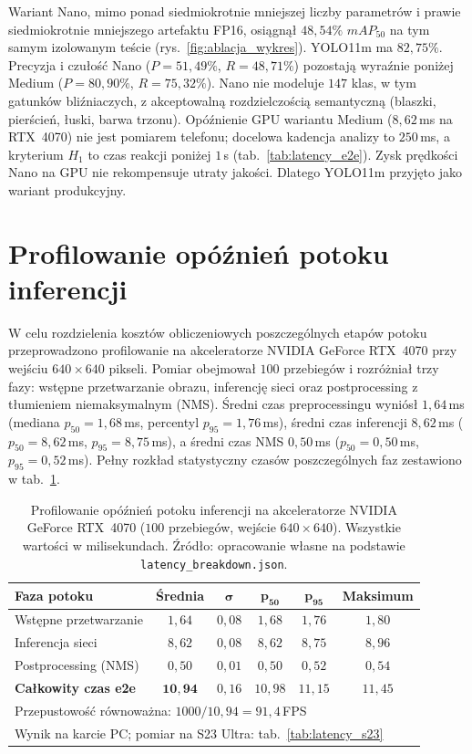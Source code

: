 Wariant Nano, mimo ponad siedmiokrotnie mniejszej liczby parametrów i prawie siedmiokrotnie mniejszego artefaktu FP16, osiągnął $48{,}54\%$ $mAP_{50}$ na tym samym izolowanym teście (rys.~\ref{fig:ablacja_wykres}). YOLO11m ma $82{,}75\%$. Precyzja i czułość Nano ($P=51{,}49\%$, $R=48{,}71\%$) pozostają wyraźnie poniżej Medium ($P=80{,}90\%$, $R=75{,}32\%$). Nano nie modeluje $147$ klas, w tym gatunków bliźniaczych, z akceptowalną rozdzielczością semantyczną (blaszki, pierścień, łuski, barwa trzonu). Opóźnienie GPU wariantu Medium ($8{,}62$\,ms na RTX~4070) nie jest pomiarem telefonu; docelowa kadencja analizy to $250$\,ms, a kryterium $H_1$ to czas reakcji poniżej $1$\,s (tab.~\ref{tab:latency_e2e}). Zysk prędkości Nano na GPU nie rekompensuje utraty jakości. Dlatego YOLO11m przyjęto jako wariant produkcyjny.

\section{Profilowanie opóźnień potoku inferencji}
W celu rozdzielenia kosztów obliczeniowych poszczególnych etapów potoku przeprowadzono profilowanie na akceleratorze NVIDIA GeForce RTX~4070 przy wejściu $640{\times}640$ pikseli. Pomiar obejmował $100$ przebiegów i rozróżniał trzy fazy: wstępne przetwarzanie obrazu, inferencję sieci oraz postprocessing z tłumieniem niemaksymalnym (NMS). Średni czas preprocessingu wyniósł $1{,}64$\,ms (mediana $p_{50}=1{,}68$\,ms, percentyl $p_{95}=1{,}76$\,ms), średni czas inferencji $8{,}62$\,ms ($p_{50}=8{,}62$\,ms, $p_{95}=8{,}75$\,ms), a średni czas NMS $0{,}50$\,ms ($p_{50}=0{,}50$\,ms, $p_{95}=0{,}52$\,ms). Pełny rozkład statystyczny czasów poszczególnych faz zestawiono w tab.~\ref{tab:latency}.

\begin{table}[htbp]
 \centering
 \caption{Profilowanie opóźnień potoku inferencji na akceleratorze NVIDIA GeForce RTX~4070 ($100$ przebiegów, wejście $640\times640$). Wszystkie wartości w milisekundach. Źródło: opracowanie własne na podstawie \texttt{latency\_breakdown.json}.}
 \label{tab:latency}
 \begin{tabular}{|l|c|c|c|c|c|}
 \hline
 \textbf{Faza potoku} & \textbf{Średnia} & $\boldsymbol{\sigma}$ & $\boldsymbol{p_{50}}$ & $\boldsymbol{p_{95}}$ & \textbf{Maksimum} \\
 \hline \hline
 Wstępne przetwarzanie & $1{,}64$ & $0{,}08$ & $1{,}68$ & $1{,}76$ & $1{,}80$ \\
 \hline
 Inferencja sieci & $8{,}62$ & $0{,}08$ & $8{,}62$ & $8{,}75$ & $8{,}96$ \\
 \hline
 Postprocessing (NMS) & $0{,}50$ & $0{,}01$ & $0{,}50$ & $0{,}52$ & $0{,}54$ \\
 \hline \hline
 \textbf{Całkowity czas e2e} & $\mathbf{10{,}94}$ & $0{,}16$ & $10{,}98$ & $11{,}15$ & $11{,}45$ \\
 \hline \hline
 \multicolumn{6}{|l|}{Przepustowość równoważna: $1000/10{,}94 = 91{,}4$\,FPS} \\
 \hline
 \multicolumn{6}{|l|}{Wynik na karcie PC; pomiar na S23 Ultra: tab.~\ref{tab:latency_s23}} \\
 \hline
 \end{tabular}
\end{table}

